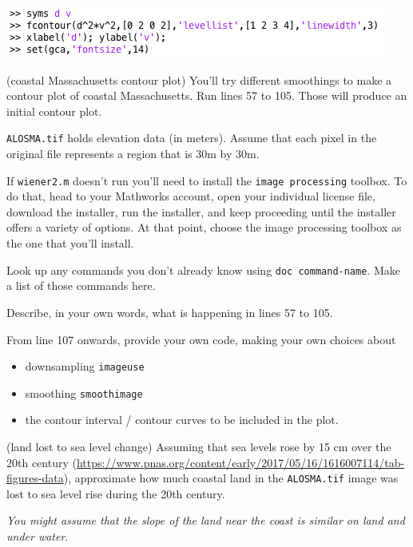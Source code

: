 \documentclass[12pt,letterpaper]{exam}
\begin{document}
\begin{questions}
\begin{solution}
\includegraphics[width=\linewidth]{img/pset02code.png}
\end{solution}

\question (coastal Massachusetts contour plot)
You'll try different smoothings to make a contour plot of coastal Massachusetts.  Run lines 57 to 105.  Those will produce an initial contour plot.

\texttt{ALOSMA.tif} holds elevation data (in meters).  Assume that each pixel in the original file represents a region that is 30m by 30m.

\begin{parts}
\item If \texttt{wiener2.m} doesn't run you'll need to install the \texttt{image processing} toolbox.  To do that, head to your Mathworks account, open your individual license file, download the installer, run the installer, and keep proceeding until the installer offers a variety of options.  At that point, choose the image processing toolbox as the one that you'll install.
\item Look up any commands you don't already know using \texttt{doc command-name}.  Make a list of those commands here.
\item Describe, in your own words, what is happening in lines 57 to 105.
\item From line 107 onwards, provide your own code, making your own choices about
\begin{itemize}
    \item downsampling \texttt{imageuse} 
    \item smoothing \texttt{smoothimage}
    \item the contour interval / contour curves to be included in the plot.
\end{itemize}

\end{parts}

\question (land lost to sea level change)
Assuming that sea levels rose by 15 cm over the 20th century (\url{https://www.pnas.org/content/early/2017/05/16/1616007114/tab-figures-data}), approximate how much coastal land in the \texttt{ALOSMA.tif} image was lost to sea level rise during the 20th century.

\emph{You might assume that the slope of the land near the coast is similar on land and under water}.


\end{questions}
\end{document}
